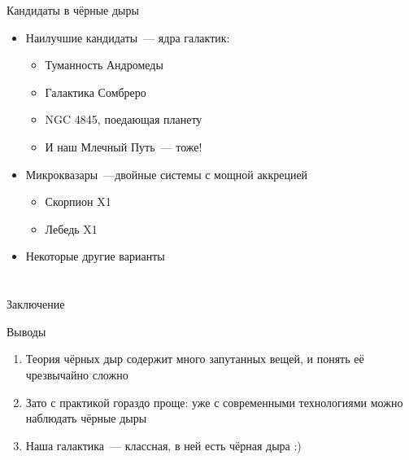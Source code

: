 \documentclass[usenames,dvipsnames,pdftex,unicode,hidelinks]{beamer}
\begin{document}
  \begin{frame}{Кандидаты в чёрные дыры}
    \begin{itemize}
      \item Наилучшие кандидаты~--- ядра галактик:
        \begin{itemize}
          \item<2-> Туманность Андромеды
          \item<2-> Галактика Сомбреро
          \item<2-> NGC 4845, поедающая планету
          \item<3-> И наш \alert{Млечный Путь}~--- тоже!
        \end{itemize}
       \item<4-> Микроквазары~---двойные системы с мощной аккрецией
        \begin{itemize}
          \item<4-> Скорпион X1
          \item<4-> Лебедь X1
        \end{itemize}
        \item<5-> Некоторые другие варианты
    \end{itemize}
  \end{frame}

  \section{}%

  \begin{frame}{Заключение}
    \begin{block}{Выводы}
      \begin{enumerate}
        \item Теория чёрных дыр содержит много запутанных вещей, и понять её чрезвычайно сложно
          \vspace{5mm}
        \item Зато с практикой гораздо проще: уже с современными технологиями можно наблюдать чёрные дыры
          \vspace{5mm}
        \item Наша галактика~--- классная, в ней есть чёрная дыра :)
      \end{enumerate}

    \end{block}
  \end{frame}
\end{document}
